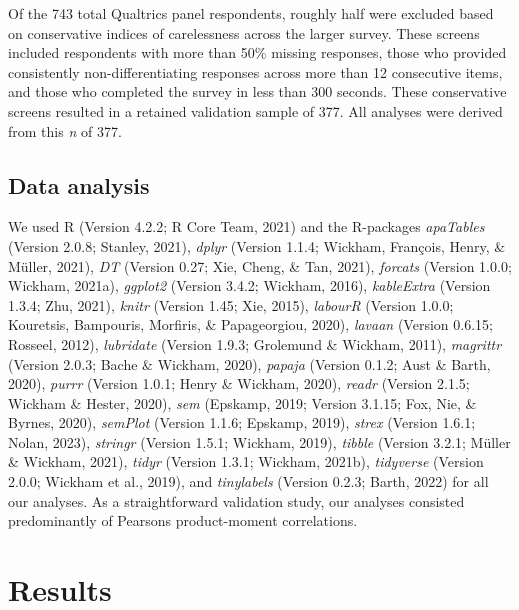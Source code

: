 \documentclass[
  man]{apa7}
\begin{document}
Of the 743 total Qualtrics panel respondents, roughly half were excluded based on conservative indices of carelessness across the larger survey. These screens included respondents with more than 50\% missing responses, those who provided consistently non-differentiating responses across more than 12 consecutive items, and those who completed the survey in less than 300 seconds. These conservative screens resulted in a retained validation sample of 377. All analyses were derived from this \emph{n} of 377.

\hypertarget{data-analysis}{%
\subsection{Data analysis}\label{data-analysis}}

We used R (Version 4.2.2; R Core Team, 2021) and the R-packages \emph{apaTables} (Version 2.0.8; Stanley, 2021), \emph{dplyr} (Version 1.1.4; Wickham, François, Henry, \& Müller, 2021), \emph{DT} (Version 0.27; Xie, Cheng, \& Tan, 2021), \emph{forcats} (Version 1.0.0; Wickham, 2021a), \emph{ggplot2} (Version 3.4.2; Wickham, 2016), \emph{kableExtra} (Version 1.3.4; Zhu, 2021), \emph{knitr} (Version 1.45; Xie, 2015), \emph{labourR} (Version 1.0.0; Kouretsis, Bampouris, Morfiris, \& Papageorgiou, 2020), \emph{lavaan} (Version 0.6.15; Rosseel, 2012), \emph{lubridate} (Version 1.9.3; Grolemund \& Wickham, 2011), \emph{magrittr} (Version 2.0.3; Bache \& Wickham, 2020), \emph{papaja} (Version 0.1.2; Aust \& Barth, 2020), \emph{purrr} (Version 1.0.1; Henry \& Wickham, 2020), \emph{readr} (Version 2.1.5; Wickham \& Hester, 2020), \emph{sem} (Epskamp, 2019; Version 3.1.15; Fox, Nie, \& Byrnes, 2020), \emph{semPlot} (Version 1.1.6; Epskamp, 2019), \emph{strex} (Version 1.6.1; Nolan, 2023), \emph{stringr} (Version 1.5.1; Wickham, 2019), \emph{tibble} (Version 3.2.1; Müller \& Wickham, 2021), \emph{tidyr} (Version 1.3.1; Wickham, 2021b), \emph{tidyverse} (Version 2.0.0; Wickham et al., 2019), and \emph{tinylabels} (Version 0.2.3; Barth, 2022) for all our analyses. As a straightforward validation study, our analyses consisted predominantly of Pearsons product-moment correlations.

\hypertarget{results}{%
\section{Results}\label{results}}
\end{document}

